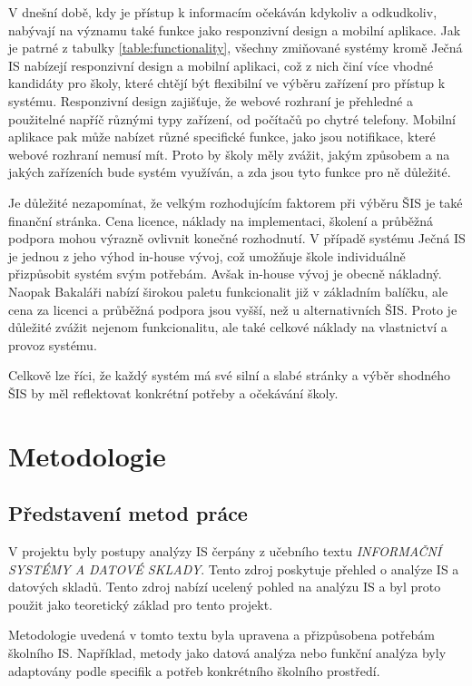 \documentclass[FM,Proj]{tulthesis}
\begin{document}
V dnešní době, kdy je přístup k informacím očekáván kdykoliv
a odkudkoliv, nabývají na významu také funkce jako responzivní 
design a mobilní aplikace. Jak je patrné z tabulky \ref{table:functionality},
všechny zmiňované systémy kromě Ječná IS nabízejí responzivní design a mobilní
aplikaci, což z nich činí více vhodné kandidáty pro školy, které chtějí
být flexibilní ve výběru zařízení pro přístup k systému.
Responzivní design zajišťuje, že webové rozhraní je přehledné
a použitelné napříč různými typy zařízení, od počítačů po chytré telefony.
Mobilní aplikace pak může nabízet různé specifické funkce, jako jsou
notifikace, které webové rozhraní nemusí mít. Proto by školy měly zvážit,
jakým způsobem a na jakých zařízeních bude systém využíván, a zda
jsou tyto funkce pro ně důležité. 

Je důležité nezapomínat, že velkým rozhodujícím faktorem při výběru
ŠIS je také finanční stránka. Cena licence, náklady na implementaci, školení a průběžná
podpora mohou výrazně ovlivnit konečné rozhodnutí. V případě systému Ječná IS je jednou
z jeho výhod in-house vývoj, což umožňuje škole individuálně přizpůsobit systém svým
potřebám. Avšak in-house vývoj je obecně nákladný. Naopak Bakaláři nabízí širokou paletu funkcionalit
již v základním balíčku, ale cena za licenci a průběžná podpora jsou vyšší, než u alternativních ŠIS.
Proto je důležité zvážit nejenom funkcionalitu, ale také celkové náklady
na vlastnictví a provoz systému.

Celkově lze říci, že každý systém má své silní a slabé stránky a výběr shodného ŠIS
by měl reflektovat konkrétní potřeby a očekávání školy.

\chapter{Metodologie}
\section{Představení metod práce}
V projektu byly postupy analýzy IS čerpány z učebního textu 
\textit{INFORMAČNÍ SYSTÉMY A DATOVÉ SKLADY}\cite{Sarmanova2008ISaDS}. Tento zdroj poskytuje
přehled o analýze IS a datových skladů. Tento zdroj nabízí ucelený pohled
na analýzu IS a byl proto použit jako teoretický základ
pro tento projekt.

Metodologie uvedená v tomto textu byla upravena a přizpůsobena potřebám školního IS.
Například, metody jako datová analýza nebo funkční analýza byly adaptovány podle
specifik a potřeb konkrétního školního prostředí.
\end{document}
